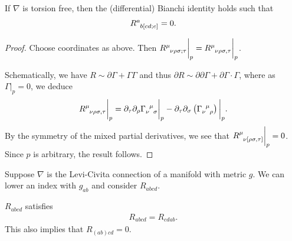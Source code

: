 \begin{proposition}
    If $\nabla$ is torsion free, then the (differential) Bianchi identity holds such that
    \begin{align}
        \tensor{R}{^{a}_{b[cd;e]}} = 0
    .\end{align}
\end{proposition}

\begin{proof}
    Choose coordinates as above. Then $\tensor{R}{^{\mu}_{\nu \rho \sigma ; \tau}}  \bigg|_p= \tensor{R}{^{\mu}_{\nu \rho \sigma , \tau}}  \bigg|_p$.

    Schematically, we have $R \sim  \partial \Gamma + \Gamma \Gamma$ and thus $\partial R \sim  \partial \partial \Gamma + \partial \Gamma \cdot \Gamma$, where as $\Gamma \bigg|_{p} = 0$, we deduce
    \begin{align}
        \tensor{R}{^{\mu}_{\nu \rho \sigma , \tau}}  \bigg|_{p} = \partial_\tau \partial_\rho \tensor{\Gamma}{_{\nu}^{\mu}_\sigma} \bigg|_{p} - \partial_\tau \partial_\sigma \left( \tensor{\Gamma}{_{\nu}^{\mu}_\rho} \right) \bigg|_p
    .\end{align}
    By the symmetry of the mixed partial derivatives, we see that $\tensor{R}{^{\mu}_{\nu [\rho \sigma, \tau]}}\bigg|_p = 0$. Since $p$ is arbitrary, the result follows.
\end{proof}

Suppose $\nabla$ is the Levi-Civita connection of a manifold with metric $g$. We can lower an index with $g_{ab}$ and consider $R_{abcd}$.

\begin{proposition}
    $R_{abcd}$ satisfies
    \begin{align}
        R_{abcd} = R_{cdab}
    .\end{align}
    This also implies that $R_{(ab)cd}= 0$.
\end{proposition}

